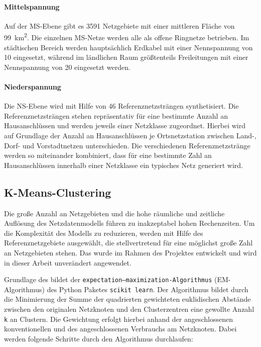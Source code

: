 \paragraph{Mittelspannung}

Auf der \gls{MS}-Ebene gibt es \num{3591} Netzgebiete mit einer mittleren Fläche von \SI{99}{\km\squared}.
Die einzelnen \gls{MS}-Netze werden alle als offene Ringnetze betrieben.
Im städtischen Bereich werden hauptsächlich Erdkabel mit einer Nennspannung von \SI{10}{\kv} eingesetzt, während im ländlichen Raum größtenteils Freileitungen mit einer Nennspannung von \SI{20}{\kv} eingesetzt werden. \cite{Mueller2019}


\paragraph{Niederspannung}

Die \gls{NS}-Ebene wird mit Hilfe von \num{46} Referenznetzsträngen synthetisiert.
Die Referenznetzsträngen stehen repräsentativ für eine bestimmte Anzahl an Hausanschlüssen und werden jeweils einer Netzklasse zugeordnet.
Hierbei wird auf Grundlage der Anzahl an Hausanschlüssen je Ortsnetzstation zwischen Land-, Dorf- und Vorstadtnetzen unterschieden.
Die verschiedenen Referenznetzstränge werden so miteinander kombiniert, dass für eine bestimmte Zahl an Hausanschlüssen innerhalb einer Netzklasse ein typisches Netz generiert wird. \cite{Mueller2019}


\subsection{K-Means-Clustering}

Die große Anzahl an Netzgebieten und die hohe räumliche und zeitliche Auflösung des Netzdatenmodells führen zu inakzeptabel hohen Rechenzeiten.
Um die Komplexität des Modells zu reduzieren, werden mit Hilfe des \kmeans Referenznetzgebiete ausgewählt, die stellvertretend für eine möglichst große Zahl an Netzgebieten stehen.
Das \kmeans wurde im Rahmen des \openego Projektes entwickelt und wird in dieser Arbeit unverändert angewendet. \cite{Mueller2019}\medskip

Grundlage des \kmeans bildet der \texttt{expectation–maximization-Algorithmus} (EM-Algorithmus) des Python Paketes \texttt{scikit learn}. \cite{scikit-learn2011}
Der Algorithmus bildet durch die Minimierung der Summe der quadrierten gewichteten euklidischen Abstände zwischen den originalen Netzknoten und den Clusterzentren eine gewollte Anzahl \texttt{k} an Clustern.
Die Gewichtung erfolgt hierbei anhand der angeschlossenen konventionellen und des angeschlossenen Verbrauchs am Netzknoten.
Dabei werden folgende Schritte durch den Algorithmus durchlaufen:

